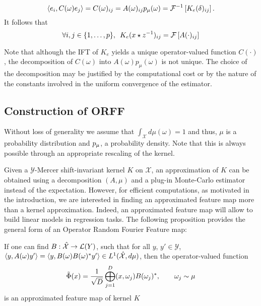 \begin{equation}
\label{eq:operator_identification_real}\langle e_i,C(\omega)e_j\rangle=C(\omega)_{ij}=A(\omega)_{ij}p_{\mu}(\omega)=\mathcal{F}^{-1}\left[K_e(\delta)_{ij}\right].
\end{equation}
It follows that
\begin{equation}\label{eq:matrix-exp}
\forall i,j \in {\left\{1, \ldots, p\right\}}, \enskip K_e(x\star {z}^{-1})_{ij}= \mathcal{F}\left[A(\cdot)_{ij}\right]
\end{equation}

\begin{remark}
Note that although the \acl{IFT} of $K_e$ yields a unique operator-valued function $C(\cdot)$, the decomposition of $C(\omega)$ into $A(\omega)p_\mu(\omega)$ is not unique. The choice of the decomposition may be justified by the computational cost or by the nature of the constants involved in the uniform convergence of the estimator.
\end{remark}

\subsection{Construction of ORFF}
Without loss of generality we assume that $\int_{\mathcal{X}} d\mu(\omega)=1$ and thus, $\mu$ is a probability distribution and $p_{\mu}$, a probability density. Note that this is always possible through an appropriate rescaling of the kernel.

Given a $\mathcal{Y}$-Mercer shift-invariant kernel $K$ on $\mathcal{X}$, an approximation of $K$ can be obtained using a decomposition $(A, \mu)$ and a plug-in Monte-Carlo estimator instead of the expectation. However, for efficient computations, as motivated in the introduction, we are interested in finding an approximated feature map more than a kernel approximation. Indeed, an approximated feature map will allow to build linear models in regression tasks. The following proposition provides the general form of an Operator Random Fourier Feature map:
\begin{proposition}\label{pr:ORFF-map}If one can find $B: \hat{\mathcal{X}} \to \mathcal{L}(Y)$, such that for all $y$, $y'\in\mathcal{Y}$, $\langle y, A(\omega)y'\rangle=\langle y, B(\omega)B(\omega)^*y'\rangle \in L^1(\hat{\mathcal{X}}, d\mu)$, then the operator-valued function
\begin{equation}\label{eq:phitilde}
\tilde{\Phi}(x)= \frac{1}{\sqrt{D}}\operatorname*{\bigoplus}_{j=1}^D(x, \omega_j)B(\omega_j)^*, \qquad \omega_j \sim \mu
\end{equation}
is an approximated feature map of kernel $K$
\end{proposition}

